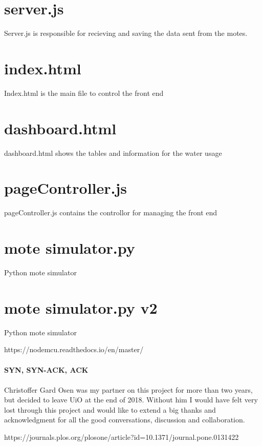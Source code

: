 \documentclass[]{uiophd}
\begin{document}
\section{server.js}
Server.js is responsible for recieving and saving the data sent from the motes.


\section{index.html}
Index.html is the main file to control the front end


\section{dashboard.html}
dashboard.html shows the tables and information for the water usage


\section{pageController.js}
pageController.js contains the controllor for managing the front end


\section{mote simulator.py}
Python mote simulator


\section{mote simulator.py v2}
Python mote simulator


https://nodemcu.readthedocs.io/en/master/
\\\\
\textbf{SYN, SYN-ACK, ACK}
\\\\
Christoffer Gard Osen was my partner on this project for more than two years, but decided to leave UiO at the end of 2018. Without him I would have felt very lost through this project and would like to extend a big thanks and acknowledgment for all the good conversations, discussion and collaboration.



https://journals.plos.org/plosone/article?id=10.1371/journal.pone.0131422
\end{document}
